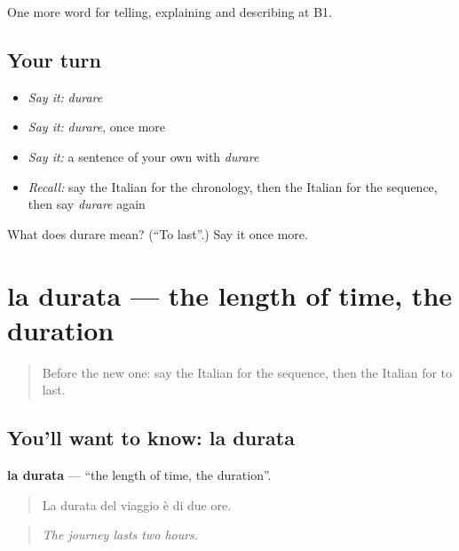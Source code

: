 \begin{grammarlens}[title={What you've built}]
One more word for telling, explaining and describing at B1.
\end{grammarlens}

\subsection*{Your turn}
\begin{itemize}
\raggedright
  \item \emph{Say it:} \emph{durare}
  \item \emph{Say it:} \emph{durare}, once more
  \item \emph{Say it:} a sentence of your own with \emph{durare}
  \item \emph{Recall:} say the Italian for the chronology, then the Italian for the sequence, then say \emph{durare} again
\end{itemize}

\begin{tcolorbox}[breakable,colback=teal!4,colframe=teal!35!black,title={Before you move on}]
What does durare mean? (\textquotedblleft{}To last\textquotedblright{}.) Say it once more.
\end{tcolorbox}
\section[la durata]{la durata — the length of time, the duration}

\label{lesson:IT-C277-durata}



\begin{quote}
Before the new one: say the Italian for the sequence, then the Italian for to last.
\end{quote}

\subsection*{You'll want to know: la durata}
\textbf{la durata} — \textquotedblleft{}the length of time, the duration\textquotedblright{}.

\begin{quote}
La durata del viaggio è di due ore.
\end{quote}

\begin{quote}
\emph{The journey lasts two hours.}
\end{quote}


